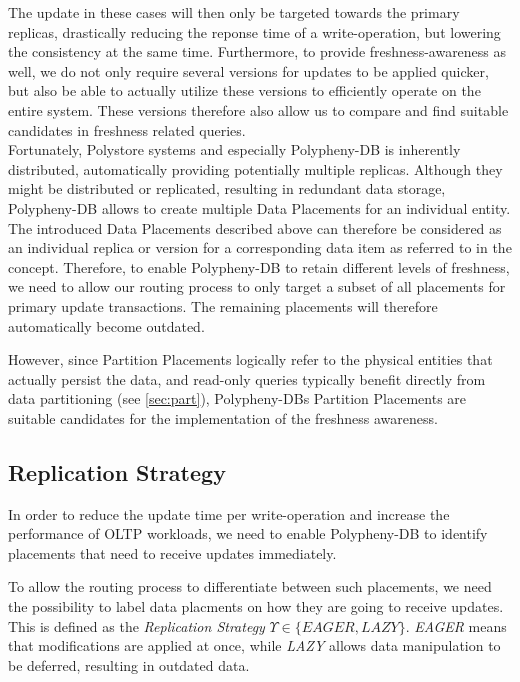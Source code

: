 The update in these cases will then only be targeted towards the primary replicas, drastically reducing the reponse time of a write-operation,
but lowering the consistency at the same time. 
Furthermore, to provide freshness-awareness as well, we do not only require several versions for updates to be applied quicker,
but also be able to actually utilize these versions to efficiently operate on the entire system.
These versions therefore also allow us to compare and find suitable candidates in freshness related queries.\\
Fortunately, Polystore systems and especially Polypheny-DB is inherently distributed, automatically providing potentially multiple replicas.
Although they might be distributed or replicated, resulting in redundant data storage, Polypheny-DB allows to create multiple Data Placements for an individual entity.
The introduced Data Placements described above can therefore be considered as an individual replica or version for a corresponding data item as referred to in the concept.
Therefore, to enable Polypheny-DB to retain different levels of freshness, we need to allow our routing process
to only target a subset of all placements for primary update transactions. The remaining placements will therefore automatically become outdated. 

However, since Partition Placements logically refer to the physical entities that actually persist the data, and 
read-only queries typically benefit directly from data partitioning (see \ref{sec:part}), Polypheny-DBs Partition Placements 
are suitable candidates for the implementation of the freshness awareness.





\subsection{Replication Strategy}
\label{sec:strategy}

In order to reduce the update time per write-operation and increase the performance
of OLTP workloads, we need to enable Polypheny-DB to identify placements that need to receive updates immediately. 

To allow the routing process to differentiate between such placements,
we need the possibility to label data placments on how they are going to receive updates. This is defined as the \emph{Replication Strategy} $\Upsilon \in \{EAGER,LAZY\}$.
\emph{EAGER} means that modifications are applied at once, while \emph{LAZY}
allows data manipulation to be deferred, resulting in outdated data.


